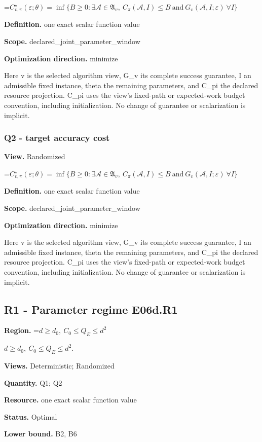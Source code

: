 \documentclass[10pt,a4paper]{article}
\newcommand{\AtlasMath}[1]{\par\begingroup\centering\setbox0=\hbox{$\displaystyle #1$}\ifdim\wd0>1.4\linewidth\typeout{ATLAS WIDE FORMULA: \the\wd0}\fi\ifdim\wd0>\linewidth\resizebox{\linewidth}{!}{\box0}\else\box0\fi\par\endgroup}
\newcommand{\AtlasInlineMath}[1]{\begingroup\setbox0=\hbox{$#1$}\ifdim\wd0>.4\linewidth\endgroup\AtlasMath{#1}\else\endgroup$#1$\fi}
\begin{document}
\AtlasMath{C^\star_{v,\pi}(\varepsilon;\theta)=\inf\{B\ge0:\exists\mathcal A\in\mathfrak A_v,\ C_\pi(\mathcal A,I)\le B\ \text{and}\ G_v(\mathcal A,I;\varepsilon)\ \forall I\}}
\textbf{Definition.} one exact scalar function value

\textbf{Scope.} declared\_joint\_parameter\_window

\textbf{Optimization direction.} minimize

Here v is the selected algorithm view, G\_v its complete success guarantee, I an admissible fixed instance, theta the remaining parameters, and C\_pi the declared resource projection. C\_pi uses the view's fixed-path or expected-work budget convention, including initialization. No change of guarantee or scalarization is implicit.

\subsubsection{Q2 - target accuracy cost}
\textbf{View.} Randomized

\AtlasMath{C^\star_{v,\pi}(\varepsilon;\theta)=\inf\{B\ge0:\exists\mathcal A\in\mathfrak A_v,\ C_\pi(\mathcal A,I)\le B\ \text{and}\ G_v(\mathcal A,I;\varepsilon)\ \forall I\}}
\textbf{Definition.} one exact scalar function value

\textbf{Scope.} declared\_joint\_parameter\_window

\textbf{Optimization direction.} minimize

Here v is the selected algorithm view, G\_v its complete success guarantee, I an admissible fixed instance, theta the remaining parameters, and C\_pi the declared resource projection. C\_pi uses the view's fixed-path or expected-work budget convention, including initialization. No change of guarantee or scalarization is implicit.

\subsection{R1 - Parameter regime E06d.R1}
\textbf{Region.} \AtlasInlineMath{d\ge d_0,\ C_0\le Q_E\le d^2}.

\textbf{Views.} Deterministic; Randomized

\textbf{Quantity.} Q1; Q2

\textbf{Resource.} one exact scalar function value

\textbf{Status.} Optimal

\textbf{Lower bound.} B2, B6
\end{document}

